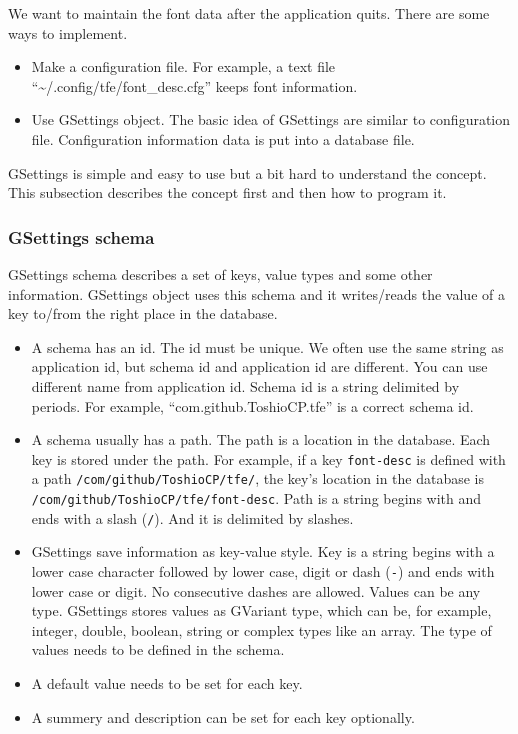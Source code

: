 We want to maintain the font data after the application quits. There are
some ways to implement.

\begin{itemize}
\tightlist
\item
  Make a configuration file. For example, a text file
  ``\textasciitilde/.config/tfe/font\_desc.cfg'' keeps font information.
\item
  Use GSettings object. The basic idea of GSettings are similar to
  configuration file. Configuration information data is put into a
  database file.
\end{itemize}

GSettings is simple and easy to use but a bit hard to understand the
concept. This subsection describes the concept first and then how to
program it.

\subsubsection{GSettings schema}\label{gsettings-schema}

GSettings schema describes a set of keys, value types and some other
information. GSettings object uses this schema and it writes/reads the
value of a key to/from the right place in the database.

\begin{itemize}
\tightlist
\item
  A schema has an id. The id must be unique. We often use the same
  string as application id, but schema id and application id are
  different. You can use different name from application id. Schema id
  is a string delimited by periods. For example,
  ``com.github.ToshioCP.tfe'' is a correct schema id.
\item
  A schema usually has a path. The path is a location in the database.
  Each key is stored under the path. For example, if a key
  \passthrough{\lstinline!font-desc!} is defined with a path
  \passthrough{\lstinline!/com/github/ToshioCP/tfe/!}, the key's
  location in the database is
  \passthrough{\lstinline!/com/github/ToshioCP/tfe/font-desc!}. Path is
  a string begins with and ends with a slash
  (\passthrough{\lstinline!/!}). And it is delimited by slashes.
\item
  GSettings save information as key-value style. Key is a string begins
  with a lower case character followed by lower case, digit or dash
  (\passthrough{\lstinline!-!}) and ends with lower case or digit. No
  consecutive dashes are allowed. Values can be any type. GSettings
  stores values as GVariant type, which can be, for example, integer,
  double, boolean, string or complex types like an array. The type of
  values needs to be defined in the schema.
\item
  A default value needs to be set for each key.
\item
  A summery and description can be set for each key optionally.
\end{itemize}

